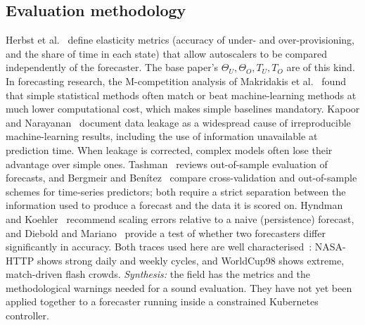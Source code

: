 \documentclass[conference,a4paper]{IEEEtran}
\begin{document}
\subsection{Evaluation methodology}
Herbst et al.~\cite{herbst2018} define elasticity metrics (accuracy of under- and over-provisioning, and the share
of time in each state) that allow autoscalers to be compared independently of the forecaster. The base paper's
$\Theta_U,\Theta_O,T_U,T_O$ are of this kind. In forecasting research, the M-competition analysis of Makridakis et
al.~\cite{makridakis2018} found that simple statistical methods often match or beat machine-learning methods at
much lower computational cost, which makes simple baselines mandatory. Kapoor and Narayanan~\cite{kapoor2023}
document data leakage as a widespread cause of irreproducible machine-learning results, including the use of
information unavailable at prediction time. When leakage is corrected, complex models often lose their advantage
over simple ones. Tashman~\cite{tashman2000} reviews out-of-sample evaluation of forecasts, and Bergmeir and
Ben\'itez~\cite{bergmeir2012} compare cross-validation and out-of-sample schemes for time-series predictors; both
require a strict separation between the information used to produce a forecast and the data it is scored on.
Hyndman and Koehler~\cite{hyndman2006} recommend scaling errors relative to a naive (persistence) forecast, and
Diebold and Mariano~\cite{diebold1995} provide a test of whether two forecasters differ significantly in accuracy. Both traces used here are well characterised~\cite{arlitt1997,arlitt2000}: NASA-HTTP shows strong
daily and weekly cycles, and WorldCup98 shows extreme, match-driven flash crowds. \emph{Synthesis:} the field has
the metrics and the methodological warnings needed for a sound evaluation. They have not yet been applied
together to a forecaster running inside a constrained Kubernetes controller.
\end{document}

